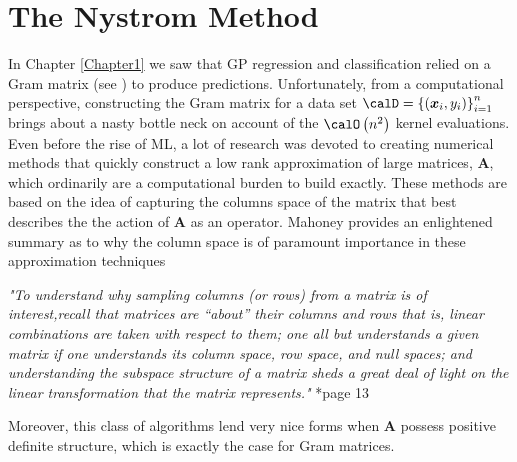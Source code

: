 \section{The Nystrom Method}\label{Chapter2}
In Chapter \ref{Chapter1} we saw that GP regression and classification relied on a Gram matrix (see ) to produce predictions. Unfortunately, from a computational perspective, constructing the Gram matrix for a data set $\calD = \left\{ \left( \bm{x}_i , y_{i} \right) \right\}_{i=1}^{n}$ brings about a nasty bottle neck on account of the $\calO \left( n^2 \right)$ kernel evaluations. Even before the rise of ML, a lot of research was devoted to creating numerical methods that quickly construct a low rank approximation of large matrices, $\bm{A}$, which ordinarily are a computational burden to build exactly. These methods are based on the idea of capturing the columns space of the matrix that best describes the the action of $\bm{A}$ as an operator. Mahoney provides an enlightened summary as to why the column space is of paramount importance in these approximation techniques
\begin{center}
    \emph{"To understand why sampling columns (or rows) from a matrix is of interest,recall that matrices are “about” their columns and rows that is, linear combinations are taken with respect to them; one all but understands a given matrix if one understands its column space, row space, and null
        spaces; and understanding the subspace structure of a matrix sheds a great deal of light on the linear transformation that the matrix represents."} \cite{DBLP:journals/corr/abs-1104-5557}*{page 13}
\end{center}
Moreover, this class of algorithms lend very nice forms when $\bm{A}$ possess positive definite structure, which is exactly the case for Gram matrices.







